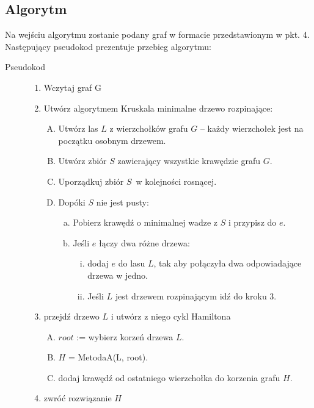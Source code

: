 \subsection{Algorytm}
Na wejściu algorytmu zostanie podany graf w formacie przedstawionym w pkt. 4. 
\\Następujący pseudokod prezentuje przebieg algorytmu:
\begin{description}

	\item[Pseudokod] \hfill
	\begin{enumerate}[1.]
		\item Wczytaj graf G
		\item Utwórz algorytmem Kruskala minimalne drzewo rozpinające:
			\begin{enumerate}[A.]
				\item Utwórz las $L$ z wierzchołków grafu $G$ – każdy wierzchołek jest na początku osobnym drzewem.
				\item Utwórz zbiór $S$ zawierający wszystkie krawędzie grafu $G$.
				\item Uporządkuj zbiór $S$\ w kolejności rosnącej.
				\item Dopóki $S$ nie jest pusty:
					\begin{enumerate}[a.]
						\item Pobierz krawędź o minimalnej wadze z $S$ i przypisz do $e$.
						\item Jeśli $e$ łączy dwa różne drzewa:
						\begin{enumerate}[i.]
						 	\item dodaj $e$ do lasu $L$, tak aby połączyła dwa odpowiadające drzewa w jedno.
						\item Jeśli $L$ jest drzewem rozpinającym idź do kroku 3.
						 \end{enumerate}
					\end{enumerate}
			\end{enumerate}
		\item przejdź drzewo $L$ i utwórz z niego cykl Hamiltona
			\begin{enumerate}[A.]
				\item $root$ := wybierz korzeń drzewa $L$.
				\item $H$ = MetodaA(L, root).
				\item dodaj krawędź od ostatniego wierzchołka do korzenia grafu $H$.
			\end{enumerate}
		\item zwróć rozwiązanie $H$
	\end{enumerate}


\end{description}
